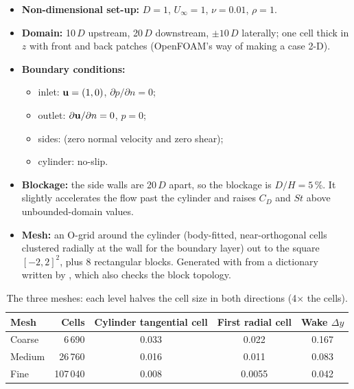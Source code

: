 \begin{itemize}
\item \textbf{Non-dimensional set-up:} $D=1$, $U_\infty=1$, $\nu=0.01$, $\rho=1$.
\item \textbf{Domain:} 10\,$D$ upstream, 20\,$D$ downstream, $\pm10\,D$ laterally; one cell thick in $z$ with  front and back patches (OpenFOAM's way of making a case 2-D).
\item \textbf{Boundary conditions:}
\begin{itemize}
\item inlet: $\mathbf{u}=(1,0)$, $\partial p/\partial n=0$;
\item outlet: $\partial\mathbf{u}/\partial n=0$, $p=0$;
\item sides:  (zero normal velocity and zero shear);
\item cylinder: no-slip.
\end{itemize}
\item \textbf{Blockage:} the side walls are 20\,$D$ apart, so the blockage is $D/H=5\,\%$. It slightly accelerates the flow past the cylinder and raises $C_D$ and $St$ above unbounded-domain values.
\item \textbf{Mesh:} an O-grid around the cylinder (body-fitted, near-orthogonal cells clustered radially at the wall for the boundary layer) out to the square $[-2,2]^2$, plus 8 rectangular blocks. Generated with  from a dictionary written by , which also checks the block topology.
\end{itemize}

\begin{table}[H]\centering\small
\begin{tabular}{@{}lrccc@{}}\toprule
Mesh & Cells & Cylinder tangential cell & First radial cell & Wake $\Delta y$\\\midrule
Coarse & 6\,690 & 0.033 & 0.022 & 0.167\\
Medium & 26\,760 & 0.016 & 0.011 & 0.083\\
Fine & 107\,040 & 0.008 & 0.0055 & 0.042\\\bottomrule
\end{tabular}
\caption{The three meshes: each level halves the cell size in both directions (4$\times$ the cells).}\end{table}

